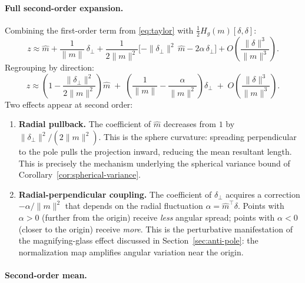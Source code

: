 \paragraph{Full second-order expansion.}

Combining the first-order term from \eqref{eq:taylor} with
$\frac{1}{2}H_g(m)[\delta,\delta]$:
%
\begin{equation}
  z \approx \hat{m}
  + \frac{1}{\|m\|}\,\delta_\perp
  + \frac{1}{2\|m\|^2}\Big[
    -\|\delta_\perp\|^2\,\hat{m}
    - 2\alpha\,\delta_\perp
  \Big]
  + O\!\left(\frac{\|\delta\|^3}{\|m\|^3}\right).
  \label{eq:taylor-second}
\end{equation}
%
Regrouping by direction:
%
\begin{equation}
  \boxed{
  z \approx
  \left(1 - \frac{\|\delta_\perp\|^2}{2\|m\|^2}\right)\hat{m}
  \;+\;
  \left(\frac{1}{\|m\|} - \frac{\alpha}{\|m\|^2}\right)\delta_\perp
  \;+\;
  O\!\left(\frac{\|\delta\|^3}{\|m\|^3}\right).
  }
  \label{eq:taylor-second-grouped}
\end{equation}
%
Two effects appear at second order:
%
\begin{enumerate}
  \item \textbf{Radial pullback.}
    The coefficient of $\hat{m}$ decreases from $1$ by
    $\|\delta_\perp\|^2 / (2\|m\|^2)$.
    This is the sphere curvature: spreading perpendicular to the pole
    pulls the projection inward, reducing the mean resultant length.
    This is precisely the mechanism underlying the spherical variance
    bound of Corollary~\ref{cor:spherical-variance}.

  \item \textbf{Radial-perpendicular coupling.}
    The coefficient of $\delta_\perp$ acquires a correction
    $-\alpha / \|m\|^2$ that depends on the radial fluctuation
    $\alpha = \hat{m}^\top\delta$.
    Points with $\alpha > 0$ (further from the origin) receive
    \emph{less} angular spread; points with $\alpha < 0$ (closer to
    the origin) receive \emph{more}.
    This is the perturbative manifestation of the magnifying-glass
    effect discussed in Section~\ref{sec:anti-pole}: the normalization
    map amplifies angular variation near the origin.
\end{enumerate}

\paragraph{Second-order mean.}

